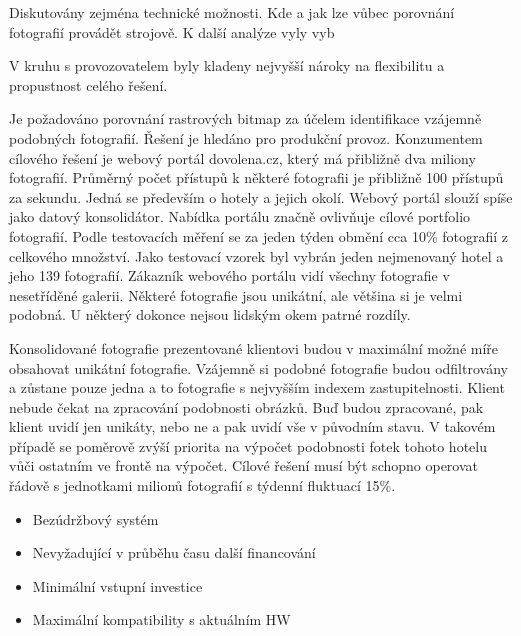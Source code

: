 Diskutovány zejména technické možnosti. Kde a jak lze vůbec porovnání fotografií provádět strojově. K další analýze vyly vyb

V kruhu s provozovatelem byly kladeny nejvyšší nároky na flexibilitu a propustnost celého řešení.


Je požadováno porovnání rastrových bitmap za účelem identifikace vzájemně podobných fotografií. Řešení je hledáno pro produkční provoz. Konzumentem cílového řešení je webový portál dovolena.cz, který má přibližně dva miliony fotografií. Průměrný počet přístupů k některé fotografii je přibližně 100 přístupů za sekundu. Jedná se především o hotely a jejich okolí. Webový portál slouží spíše jako datový konsolidátor. Nabídka portálu značně ovlivňuje cílové portfolio fotografií. Podle testovacích měření se za jeden týden obmění cca 10\% fotografií z celkového množství. Jako testovací vzorek byl vybrán jeden nejmenovaný hotel a jeho 139 fotografií. Zákazník webového portálu vidí všechny fotografie v nesetříděné galerii. Některé fotografie jsou unikátní, ale většina si je velmi podobná. U některý dokonce nejsou lidským okem patrné rozdíly.

Konsolidované fotografie prezentované klientovi budou v maximální možné míře obsahovat unikátní fotografie. Vzájemně si podobné fotografie budou odfiltrovány a zůstane pouze jedna a to fotografie s nejvyšším indexem zastupitelnosti. Klient nebude čekat na zpracování podobnosti obrázků. Buď budou zpracované, pak klient uvidí jen unikáty, nebo ne a pak uvidí vše v původním stavu. V takovém případě se poměrově zvýší priorita na výpočet podobnosti fotek tohoto hotelu vůči ostatním ve frontě na výpočet. Cílové řešení musí být schopno operovat řádově s jednotkami milionů fotografií s týdenní fluktuací 15\%.

\begin{itemize}
	\setlength{\parskip}{0pt}
	\setlength{\itemsep}{0pt}
	\item {Bezúdržbový systém}
	\item {Nevyžadující v průběhu času další financování}
	\item {Minimální vstupní investice}
	\item {Maximální kompatibility s aktuálním HW}
\end{itemize}

